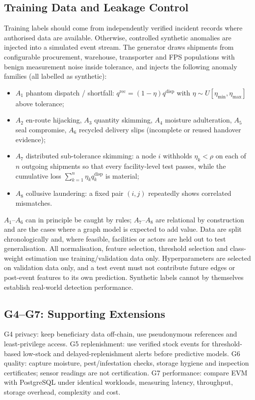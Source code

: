 \documentclass[conference,a4paper]{IEEEtran}
\newcommand{\qdisp}{q^{\mathrm{disp}}}
\newcommand{\qrec}{q^{\mathrm{rec}}}
\begin{document}
\subsection{Training Data and Leakage Control}
Training labels should come from independently verified incident records where authorised data are available. Otherwise, controlled synthetic anomalies are injected into a simulated event stream. The generator draws shipments from configurable procurement, warehouse, transporter and FPS populations with benign measurement noise inside tolerance, and injects the following anomaly families (all labelled as synthetic):
\begin{itemize}
\item $A_1$ phantom dispatch / shortfall: $\qrec=(1-\eta)\qdisp$ with $\eta\sim U[\eta_{\min},\eta_{\max}]$ above tolerance;
\item $A_2$ en-route hijacking, $A_3$ quantity skimming, $A_4$ moisture adulteration, $A_5$ seal compromise, $A_6$ recycled delivery slips (incomplete or reused handover evidence);
\item $A_7$ distributed sub-tolerance skimming: a node $i$ withholds $\eta_k<\rho$ on each of $n$ outgoing shipments so that every facility-level test passes, while the cumulative loss $\sum_{k=1}^{n}\eta_k\qdisp_k$ is material;
\item $A_8$ collusive laundering: a fixed pair $(i,j)$ repeatedly shows correlated mismatches.
\end{itemize}
$A_1$--$A_6$ can in principle be caught by rules; $A_7$--$A_8$ are relational by construction and are the cases where a graph model is expected to add value. Data are split chronologically and, where feasible, facilities or actors are held out to test generalisation. All normalisation, feature selection, threshold selection and class-weight estimation use training/validation data only. Hyperparameters are selected on validation data only, and a test event must not contribute future edges or post-event features to its own prediction. Synthetic labels cannot by themselves establish real-world detection performance.

\subsection{G4--G7: Supporting Extensions}
G4 privacy: keep beneficiary data off-chain, use pseudonymous references and least-privilege access. G5 replenishment: use verified stock events for threshold-based low-stock and delayed-replenishment alerts before predictive models. G6 quality: capture moisture, pest/infestation checks, storage hygiene and inspection certificates; sensor readings are not certification. G7 performance: compare EVM with PostgreSQL under identical workloads, measuring latency, throughput, storage overhead, complexity and cost.
\end{document}
